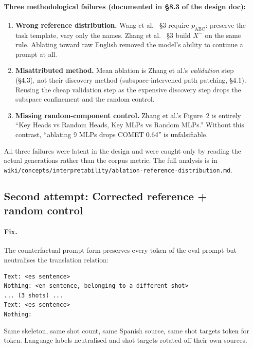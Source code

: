 \documentclass[11pt,a4paper]{article}
\begin{document}
\paragraph{Three methodological failures (documented in \S8.3 of the design doc):}

\begin{enumerate}
\item \textbf{Wrong reference distribution.} Wang et al.~\cite{ioi} \S3 require
  \(p_\text{ABC}\): preserve the task template, vary only the names. Zhang et
  al.~\cite{zhang2025} \S3 build \(X^{-}\) on the same rule. Ablating toward raw English
  removed the model's ability to continue a prompt at all.
\item \textbf{Misattributed method.} Mean ablation is Zhang et al.'s \emph{validation}
  step (\S4.3), not their discovery method (subspace-intervened path patching, \S4.1).
  Reusing the cheap validation step as the expensive discovery step drops the subspace
  confinement and the random control.
\item \textbf{Missing random-component control.} Zhang et al.'s Figure~2 is entirely
  ``Key Heads vs Random Heads, Key MLPs vs Random MLPs.'' Without this contrast, ``ablating
  9 MLPs drops COMET 0.64'' is unfalsifiable.
\end{enumerate}

All three failures were latent in the design and were caught only by reading the actual
generations rather than the corpus metric. The full analysis is in
\texttt{wiki/concepts/interpretability/ablation-reference-distribution.md}.

\subsection{Second attempt: Corrected reference + random control}

\paragraph{Fix.} The counterfactual prompt form preserves every token of the eval prompt
but neutralises the translation relation:
\begin{verbatim}
Text: <es sentence>
Nothing: <en sentence, belonging to a different shot>
... (3 shots) ...
Text: <es sentence>
Nothing:
\end{verbatim}
Same skeleton, same shot count, same Spanish source, same shot targets token for token.
Language labels neutralised and shot targets rotated off their own sources.
\end{document}
